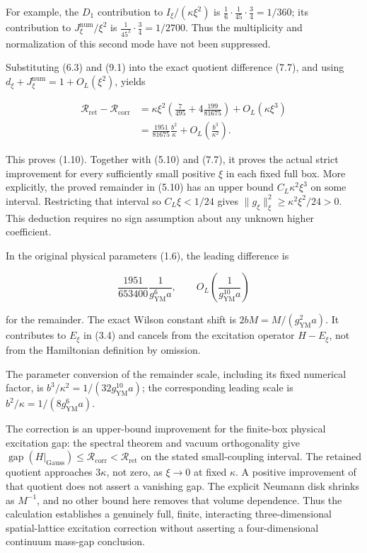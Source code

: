For example, the \(D_1\) contribution to \(I_\xi/(\kappa\xi^2)\) is
\(\tfrac16\cdot\tfrac1{45}\cdot\tfrac34=1/360\); its contribution to
\(J_\xi^{\mathrm{num}}/\xi^2\) is \(\tfrac1{45^2}\cdot\tfrac34=1/2700\).
Thus the multiplicity and normalization of this second mode have not
been suppressed.

Substituting (6.3) and (9.1) into the exact quotient difference (7.7),
and using \(d_\xi+J_\xi^{\mathrm{num}}=1+O_L(\xi^2)\), yields

\[
\begin{split}
\mathcal R_{\mathrm{ret}}-\mathcal R_{\mathrm{corr}}
&=\kappa\xi^2\left(\frac7{495}+4\frac{199}{81675}\right)
 +O_L(\kappa\xi^3)\\
&=\frac{1951}{81675}\frac{b^2}{\kappa}
 +O_L\!\left(\frac{b^3}{\kappa^2}\right).
\end{split}
\tag{9.2}
\]

This proves (1.10). Together with (5.10) and (7.7), it proves the actual
strict improvement for every sufficiently small positive \(\xi\) in each
fixed full box. More explicitly, the proved remainder in (5.10) has an
upper bound \(C_L\kappa^2\xi^3\) on some interval. Restricting that
interval so \(C_L\xi<1/24\) gives
\(\|g_\xi\|_\xi^2\geq\kappa^2\xi^2/24>0\). This deduction requires no
sign assumption about any unknown higher coefficient.

In the original physical parameters (1.6), the leading difference is

\[
\frac{1951}{653400}\frac{1}{g_{\mathrm{YM}}^6a},
\qquad O_L\!\left(\frac{1}{g_{\mathrm{YM}}^{10}a}\right)
\tag{9.3}
\]

for the remainder. The exact Wilson constant shift is
\(2bM=M/(g_{\mathrm{YM}}^2a)\). It contributes to \(E_\xi\) in (3.4) and
cancels from the excitation operator \(H-E_\xi\), not from the
Hamiltonian definition by omission.

The parameter conversion of the remainder scale, including its fixed
numerical factor, is \(b^3/\kappa^2=1/(32g_{\mathrm{YM}}^{10}a)\); the
corresponding leading scale is \(b^2/\kappa=1/(8g_{\mathrm{YM}}^6a)\).

The correction is an upper-bound improvement for the finite-box physical
excitation gap: the spectral theorem and vacuum orthogonality give
\(\operatorname{gap}(H|_{\mathrm{Gauss}})\leq\mathcal R_{\mathrm{corr}}<\mathcal R_{\mathrm{ret}}\)
on the stated small-coupling interval. The retained quotient approaches
\(3\kappa\), not zero, as \(\xi\to0\) at fixed \(\kappa\). A positive
improvement of that quotient does not assert a vanishing gap. The
explicit Neumann disk shrinks as \(M^{-1}\), and no other bound here
removes that volume dependence. Thus the calculation establishes a
genuinely full, finite, interacting three-dimensional spatial-lattice
excitation correction without asserting a four-dimensional continuum
mass-gap conclusion.

